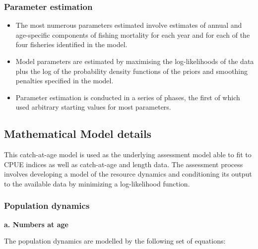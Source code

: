 \documentclass{article}
\begin{document}

\subsubsection{Parameter estimation}


\begin{itemize}

\item The most numerous parameters estimated involve estimates of annual and age-specific components of fishing mortality for each year and for each of the four fisheries identified in the model.

\item Model parameters are estimated by maximising the log-likelihoods of the data plus the log of the probability density functions of the priors and smoothing penalties specified in the model.

\item Parameter estimation is conducted in a series of phases, the first of which used arbitrary starting values for most parameters.

\end{itemize}


\subsection{Mathematical Model details}

This catch-at-age model is used as the underlying assessment model able to fit to CPUE indices as well as catch-at-age and length data. The assessment process involves developing a model of the resource dynamics and conditioning its output to the available data by minimizing a log-likelihood function.

\subsubsection{Population dynamics}

\textbf{a. Numbers at age}

The population dynamics are modelled by the following set of equations:
\end{document}
